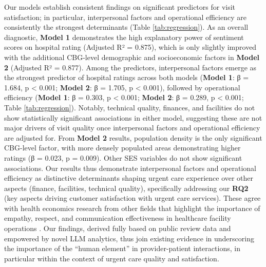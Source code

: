 \documentclass[journal,twoside,web]{ieeecolor}
\begin{document}
Our models establish consistent findings on significant predictors for visit satisfaction; in particular, interpersonal factors and operational efficiency are consistently the strongest determinants (Table \ref{tab:regression}). As an overall diagnostic, \textbf{Model 1} demonstrates the high explanatory power of sentiment scores on hospital rating (Adjusted R² = 0.875), which is only slightly improved with the additional CBG-level demographic and socioeconomic factors in \textbf{Model 2} (Adjusted R² = 0.877). Among the predictors, interpersonal factors emerge as the strongest predictor of hospital ratings across both models (\textbf{Model 1}: β = 1.684, p < 0.001; \textbf{Model 2}: β = 1.705, p < 0.001), followed by operational efficiency (\textbf{Model 1}: β = 0.303, p < 0.001; \textbf{Model 2}: β = 0.289, p < 0.001; Table \ref{tab:regression}). Notably, technical quality, finances, and facilities do not show statistically significant associations in either model, suggesting these are not major drivers of visit quality once interpersonal factors and operational efficiency are adjusted for. From \textbf{Model 2} results, population density is the only significant CBG-level factor, with more densely populated areas demonstrating higher ratings (β = 0.023, p = 0.009). Other SES variables do not show significant associations. Our results thus demonstrate interpersonal factors and operational efficiency as distinctive determinants shaping urgent care experience over other aspects (finance, facilities, technical quality), specifically addressing our \textbf{RQ2} (key aspects driving customer satisfaction with urgent care services). These agree with health economics research from other fields that highlight the importance of empathy, respect, and communication effectiveness in healthcare facility operations \cite{batbaatar2017determinants,derksen2013effectiveness}. Our findings, derived fully based on public review data and empowered by novel LLM analytics, thus join existing evidence in underscoring the importance of the ``human element'' in provider-patient interactions, in particular within the context of urgent care quality and satisfaction.
\end{document}
